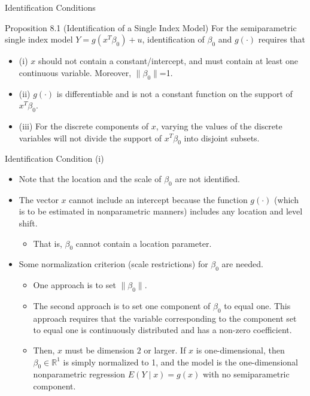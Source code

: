 \documentclass[xcolor=svgnames,dvipdfmx,cjk]{beamer}
\theoremstyle{example}
\begin{document}
\begin{frame}{Identification Conditions}
  \begin{itembox}[l]{Proposition 8.1 (Identification of a Single Index Model)}
    \quad 
    For the semiparametric single index model $Y = g(x^{T} \beta_0) + u$,
    identification of $\beta_0$ and $g(\cdot)$ requires that
    \begin{itemize}
      \item (i)
            $x$ should not contain a constant/intercept, 
            and must contain at least one continuous variable.
            Moreover, $\|\beta_0\|$=1.
      \item (ii)
            $g(\cdot)$ is differentiable 
            and is not a constant function on the support of $x^{T}\beta_0$.
      \item (iii)
            For the discrete components of $x$, 
            varying the values of the discrete variables will not divide the support of $x^{T}\beta_0$ into disjoint subsets.
    \end{itemize}
  \end{itembox}
\end{frame}

\begin{frame}{Identification Condition (i)}
\begin{itemize}
  \item Note that the location and the scale of $\beta_0$ are not identified.
  \item The vector $x$ cannot include an intercept 
        because the function $g(\cdot)$ (which is to be estimated in nonparametric manners) includes any location and level shift.
        \begin{itemize}
          \item That is, $\beta_0$ cannot contain a location parameter.
        \end{itemize}
  \item Some normalization criterion (scale restrictions) for $\beta_0$ are needed.
        \begin{itemize}
          \item One approach is to set $\| \beta_0 \|$.
          \item The second approach is to set one component of $\beta_0$ to equal one. 
                This approach requires that 
                the variable corresponding to the component set to equal one 
                is continuously distributed 
                and has a non-zero coefficient.
          \item Then, $x$ must be dimension $2$ or larger. 
                If $x$ is one-dimensional, then $\beta_0 \in \mathbb{R}^1$ is simply normalized to 1, 
                and the model is the one-dimensional nonparametric regression $E(Y \mid x) = g(x)$ with no semiparametric component.
        \end{itemize}
\end{itemize}
\end{frame}
\end{document}

